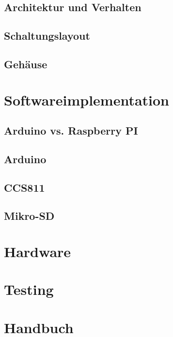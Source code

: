 \documentclass[12pt,			%
a4paper,						%
twoside, 						%
listof=totoc, 					%
bibliography=totoc,				%
titlepage, 						%
headsepline, 					%
DIV18,							%
BCOR6mm,						%
cleardoublepage=empty,			%
parskip,						%
ngerman							%
]{scrbook}
\begin{document}
\section{Architektur und Verhalten}

\section{Schaltungslayout}

\section{Gehäuse}


\chapter{Softwareimplementation}

\section{Arduino vs. Raspberry PI}

\section{Arduino}


\section{CCS811}


\section{Mikro-SD}


\chapter{Hardware}


\chapter{Testing}


\chapter{Handbuch}

\end{document}
